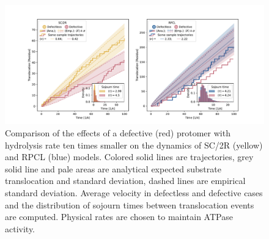     \begin{figure}[h]
        \hspace*{-0.25\textwidth}
        \centering
        \includegraphics[width=1.5\textwidth]{images/defective.pdf}
        \caption{Comparison of the effects of a defective (red) protomer with hydrolysis rate ten times smaller on the dynamics of SC/2R (yellow) and RPCL (blue) models. Colored solid lines are trajectories, grey solid line and pale areas are analytical expected substrate translocation and standard deviation, dashed lines are empirical standard deviation. Average velocity in defectless and defective cases and the distribution of sojourn times between translocation events are computed. Physical rates are chosen to maintain ATPase activity.}
        \label{fig:defective}
    \end{figure}
